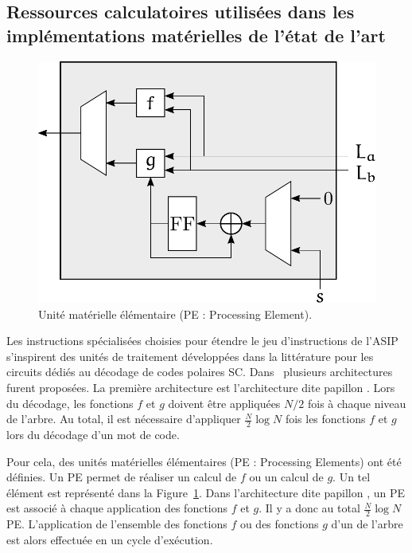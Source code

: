 \subsection{Ressources calculatoires utilisées dans les implémentations matérielles de l'état de l'art}
\label{subsec:hard_sc}

\begin{figure}[t]
\centering
\includegraphics[scale=0.75]{main/ch3_fig/PE}
\caption{Unité matérielle élémentaire (PE : Processing Element).}
\label{fig:pe}
\end{figure}


Les instructions spécialisées choisies pour étendre le jeu d'instructions de l'ASIP s'inspirent des unités de traitement développées dans la littérature pour les circuits dédiés au décodage de codes polaires SC. Dans~\cite{leroux_hardware_2011} plusieurs architectures furent proposées. La première architecture est l'architecture dite \og papillon \fg. Lors du décodage, les fonctions $f$ et $g$ doivent être appliquées $N/2$ fois à chaque niveau de l'arbre. Au total, il est nécessaire d'appliquer $\frac{N}{2} \log N$ fois les fonctions $f$ et $g$ lors du décodage d'un mot de code. 

Pour cela, des unités matérielles élémentaires (PE : Processing Elements) ont été définies.
Un PE permet de réaliser un calcul de $f$ ou un calcul de $g$. Un tel élément est représenté dans la Figure~\ref{fig:pe}.
Dans l'architecture dite \og papillon \fg, un PE est associé à chaque application des fonctions $f$ et $g$.
Il y a donc au total $\frac{N}{2} \log N$ PE.
L'application de l'ensemble des fonctions $f$ ou des fonctions $g$ d'un \noeud de l'arbre est alors effectuée en un cycle d'exécution.

